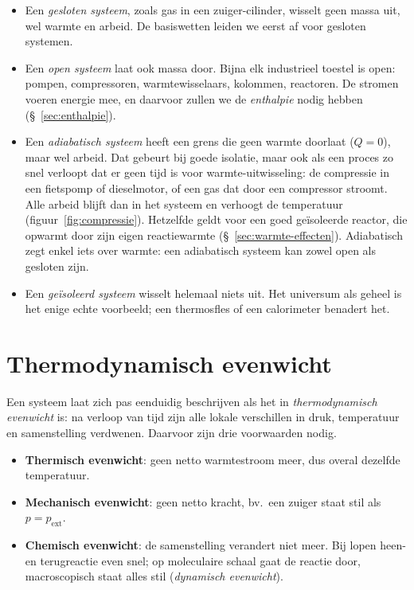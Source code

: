 \begin{itemize}
\item Een \emph{gesloten systeem}, zoals gas in een zuiger-cilinder, wisselt geen massa uit, wel warmte en arbeid. De basiswetten leiden we eerst af voor gesloten systemen.
\item Een \emph{open systeem} laat ook massa door. Bijna elk industrieel toestel is open: pompen, compressoren, warmtewisselaars, kolommen, reactoren. De stromen voeren energie mee, en daarvoor zullen we de \emph{enthalpie} nodig hebben (\S~\ref{sec:enthalpie}).
\item Een \emph{adiabatisch systeem} heeft een grens die geen warmte doorlaat ($Q = 0$), maar wel arbeid. Dat gebeurt bij goede isolatie, maar ook als een proces zo snel verloopt dat er geen tijd is voor warmte-uitwisseling: de compressie in een fietspomp of dieselmotor, of een gas dat door een compressor stroomt. Alle arbeid blijft dan in het systeem en verhoogt de temperatuur (figuur~\ref{fig:compressie}). Hetzelfde geldt voor een goed ge\"isoleerde reactor, die opwarmt door zijn eigen reactiewarmte (\S~\ref{sec:warmte-effecten}). Adiabatisch zegt enkel iets over warmte: een adiabatisch systeem kan zowel open als gesloten zijn.
\item Een \emph{ge\"isoleerd systeem} wisselt helemaal niets uit. Het universum als geheel is het enige echte voorbeeld; een thermosfles of een calorimeter benadert het.
\end{itemize}


\section{Thermodynamisch evenwicht}

Een systeem laat zich pas eenduidig beschrijven als het in \emph{thermodynamisch evenwicht} is: na verloop van tijd zijn alle lokale verschillen in druk, temperatuur en samenstelling verdwenen. Daarvoor zijn drie voorwaarden nodig.
\begin{itemize}
\item \textbf{Thermisch evenwicht}: geen netto warmtestroom meer, dus overal dezelfde temperatuur.
\item \textbf{Mechanisch evenwicht}: geen netto kracht, bv.\ een zuiger staat stil als $p = p_\text{ext}$.
\item \textbf{Chemisch evenwicht}: de samenstelling verandert niet meer. Bij  lopen heen- en terugreactie even snel; op moleculaire schaal gaat de reactie door, macroscopisch staat alles stil (\emph{dynamisch evenwicht}).
\end{itemize}

